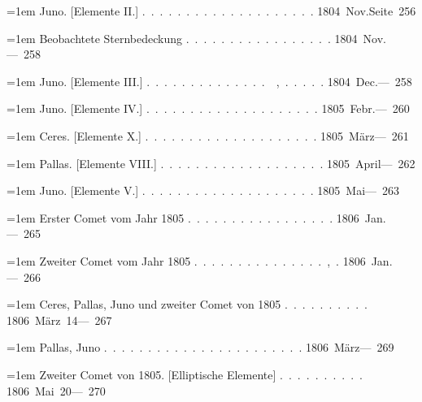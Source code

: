 \clearpage
{}
\begingroup
\raggedright
\noindent\hangindent=1em Juno. [Elemente II.] \mbox{.\ .\ .\ .\ .\ .\ .\ .\ .\ .\ .\ .\ .\ .\ .\ .\ .\ .\ .\ .} \hfill\mbox{1804 Nov.}\quad\mbox{Seite 256}\par\smallskip
\noindent\hangindent=1em Beobachtete Sternbedeckung \mbox{.\ .\ .\ .\ .\ .\ .\ .\ .\ .\ .\ .\ .\ .\ .\ .\ .} \hfill\mbox{1804 Nov.}\quad\mbox{--- 258}\par\smallskip
\noindent\hangindent=1em Juno. [Elemente III.] \mbox{.\ .\ .\ .\ .\ .\ .\ .\ .\ .\ .\ .\ .\ .\ \ ,\ .\ .\ .\ .\ .} \hfill\mbox{1804 Dec.}\quad\mbox{--- 258}\par\smallskip
\noindent\hangindent=1em Juno. [Elemente IV.] \mbox{.\ .\ .\ .\ .\ .\ .\ .\ .\ .\ .\ .\ .\ .\ .\ .\ .\ .\ .\ .} \hfill\mbox{1805 Febr.}\quad\mbox{--- 260}\par\smallskip
\noindent\hangindent=1em Ceres. [Elemente X.] \mbox{.\ .\ .\ .\ .\ .\ .\ .\ .\ .\ .\ .\ .\ .\ .\ .\ .\ .\ .\ .} \hfill\mbox{1805 März}\quad\mbox{--- 261}\par\smallskip
\noindent\hangindent=1em Pallas. [Elemente VIII.] \mbox{.\ .\ .\ .\ .\ .\ .\ .\ .\ .\ .\ .\ .\ .\ .\ .\ .\ .\ .} \hfill\mbox{1805 April}\quad\mbox{--- 262}\par\smallskip
\noindent\hangindent=1em Juno. [Elemente V.] \mbox{.\ .\ .\ .\ .\ .\ .\ .\ .\ .\ .\ .\ .\ .\ .\ .\ .\ .\ .\ .} \hfill\mbox{1805 Mai}\quad\mbox{--- 263}\par\smallskip
\noindent\hangindent=1em Erster Comet vom Jahr 1805 \mbox{.\ .\ .\ .\ .\ .\ .\ .\ .\ .\ .\ .\ .\ .\ .\ .\ .} \hfill\mbox{1806 Jan.}\quad\mbox{---\textperiodcentered{} 265}\par\smallskip
\noindent\hangindent=1em Zweiter Comet vom Jahr 1805 \mbox{.\ .\ .\ .\ .\ .\ .\ .\ .\ .\ .\ .\ .\ .\ .\ ,\ .} \hfill\mbox{1806 Jan.}\quad\mbox{--- 266}\par\smallskip
\noindent\hangindent=1em Ceres, Pallas, Juno und zweiter Comet von 1805 \mbox{.\ .\ .\ .\ .\ .\ .\ .\ .\ .} \hfill\mbox{1806 März 14}\quad\mbox{--- 267}\par\smallskip
\noindent\hangindent=1em Pallas, Juno \mbox{.\ .\ .\ .\ .\ .\ .\ .\ .\ .\ .\ .\ .\ .\ .\ .\ .\ .\ .\ .\ .\ .\ .} \hfill\mbox{1806 März}\quad\mbox{--- 269}\par\smallskip
\noindent\hangindent=1em Zweiter Comet von 1805. [Elliptische Elemente] \mbox{.\ .\ .\ .\ .\ .\ .\ .\ .\ .} \hfill\mbox{1806 Mai 20}\quad\mbox{--- 270}\par\smallskip

